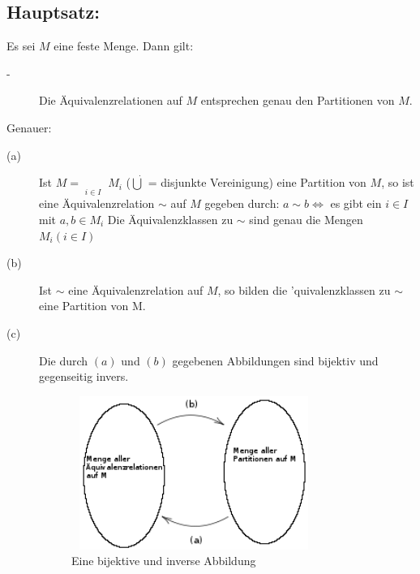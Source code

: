 \subsection{Hauptsatz:}
Es sei $M$ eine feste Menge. Dann gilt:
\begin{description}
	\item[-] Die Äquivalenzrelationen auf $M$ entsprechen genau den Partitionen von $M$.
\end{description}
Genauer:
\begin{description}
	\item[(a)] Ist $M = \mathop{\dot{\bigcup}}\limits_{i \in I}$ $M_{i}$ ($\dot{\bigcup}$  = disjunkte Vereinigung) eine Partition von $M$, so ist eine Äquivalenzrelation $\sim$ auf $M$ gegeben durch: $a \sim b \Leftrightarrow$ es gibt ein $i \in I$ mit $a,b \in M_{i}$ Die Äquivalenzklassen zu $\sim$ sind genau die Mengen $M_{i} (i \in I)$
	\item[(b)] Ist $\sim$ eine Äquivalenzrelation auf $M$, so bilden die 'quivalenzklassen zu $\sim$ eine Partition von M.
	\item[(c)] Die durch $(a)$ und $(b)$ gegebenen Abbildungen sind bijektiv und gegenseitig invers. 
		\begin{figure} [H]
		\centering 
		\includegraphics[width=8cm, height=5cm]{mainmatter/chapter1/pics/bijektivinvers.png}
		\caption{Eine bijektive und inverse Abbildung} 
		\end{figure}
\end{description}
%
%
%
